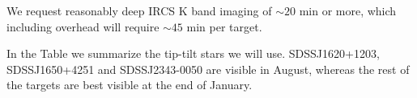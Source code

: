 \begin{technicalinfo}
\medskip
\vspace{-0.5cm}
We request reasonably deep IRCS K band imaging of $\sim20$ min or more, which including overhead will require $\sim45$ min per target.

In the Table we summarize the tip-tilt
stars we will use. SDSSJ1620+1203, SDSSJ1650+4251 and SDSSJ2343-0050 are visible in August, whereas the rest of the targets are best visible at the end of January.
\\





\end{technicalinfo}
